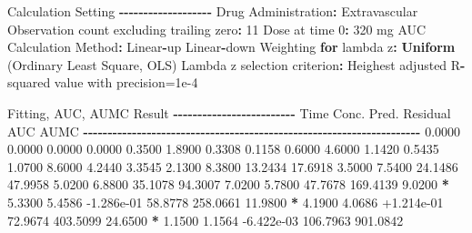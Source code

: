 \documentclass[
  10pt,
]{krantz}
\makeatletter
\newenvironment{Shaded}{\begin{snugshade}}{\end{snugshade}}
\newcommand{\ControlFlowTok}[1]{\textcolor[rgb]{0.13,0.29,0.53}{\textbf{#1}}}
\newcommand{\DecValTok}[1]{\textcolor[rgb]{0.00,0.00,0.81}{#1}}
\newcommand{\FloatTok}[1]{\textcolor[rgb]{0.00,0.00,0.81}{#1}}
\newcommand{\KeywordTok}[1]{\textcolor[rgb]{0.13,0.29,0.53}{\textbf{#1}}}
\newcommand{\NormalTok}[1]{#1}
\newcommand{\OperatorTok}[1]{\textcolor[rgb]{0.81,0.36,0.00}{\textbf{#1}}}
\newcommand{\StringTok}[1]{\textcolor[rgb]{0.31,0.60,0.02}{#1}}
\newenvironment{kframe}{%
\medskip{}
\setlength{\fboxsep}{.8em}
 \def\at@end@of@kframe{}%
 \ifinner\ifhmode%
  \def\at@end@of@kframe{\end{minipage}}%
  \begin{minipage}{\columnwidth}%
 \fi\fi%
 \def\FrameCommand##1{\hskip\@totalleftmargin \hskip-\fboxsep
 \colorbox{shadecolor}{##1}\hskip-\fboxsep
     \hskip-\linewidth \hskip-\@totalleftmargin \hskip\columnwidth}%
 \MakeFramed {\advance\hsize-\width
   \@totalleftmargin\z@ \linewidth\hsize
   \@setminipage}}%
 {\par\unskip\endMakeFramed%
 \at@end@of@kframe}
\renewenvironment{Shaded}{\begin{kframe}}{\end{kframe}}
\makeatother
\begin{document}
\begin{Shaded}
\begin{Highlighting}[]
\NormalTok{Calculation Setting}
\OperatorTok{{-}{-}{-}{-}{-}{-}{-}{-}{-}{-}{-}{-}{-}{-}{-}{-}{-}{-}{-}}
\NormalTok{Drug Administration}\OperatorTok{:}\StringTok{ }\NormalTok{Extravascular}
\NormalTok{Observation count excluding trailing zero}\OperatorTok{:}\StringTok{ }\DecValTok{11}
\NormalTok{Dose at time }\DecValTok{0}\OperatorTok{:}\StringTok{ }\DecValTok{320}\NormalTok{ mg}
\NormalTok{AUC Calculation Method}\OperatorTok{:}\StringTok{ }\NormalTok{Linear}\OperatorTok{{-}}\NormalTok{up Linear}\OperatorTok{{-}}\NormalTok{down}
\NormalTok{Weighting }\ControlFlowTok{for}\NormalTok{ lambda z}\OperatorTok{:}\StringTok{ }\KeywordTok{Uniform}\NormalTok{ (Ordinary Least Square, OLS)}
\NormalTok{Lambda z selection criterion}\OperatorTok{:}\StringTok{ }\NormalTok{Heighest adjusted R}\OperatorTok{{-}}\NormalTok{squared value with precision=}\FloatTok{1e{-}4}


\NormalTok{Fitting, AUC, AUMC Result}
\OperatorTok{{-}{-}{-}{-}{-}{-}{-}{-}{-}{-}{-}{-}{-}{-}{-}{-}{-}{-}{-}{-}{-}{-}{-}{-}{-}}
\StringTok{      }\NormalTok{Time         Conc.      Pred.   Residual       AUC       AUMC}
\OperatorTok{{-}{-}{-}{-}{-}{-}{-}{-}{-}{-}{-}{-}{-}{-}{-}{-}{-}{-}{-}{-}{-}{-}{-}{-}{-}{-}{-}{-}{-}{-}{-}{-}{-}{-}{-}{-}{-}{-}{-}{-}{-}{-}{-}{-}{-}{-}{-}{-}{-}{-}{-}{-}{-}{-}{-}{-}{-}{-}{-}{-}{-}{-}{-}{-}{-}{-}{-}{-}{-}}
\StringTok{     }\FloatTok{0.0000}       \FloatTok{0.0000}                           \FloatTok{0.0000}     \FloatTok{0.0000}
     \FloatTok{0.3500}       \FloatTok{1.8900}                           \FloatTok{0.3308}     \FloatTok{0.1158}
     \FloatTok{0.6000}       \FloatTok{4.6000}                           \FloatTok{1.1420}     \FloatTok{0.5435}
     \FloatTok{1.0700}       \FloatTok{8.6000}                           \FloatTok{4.2440}     \FloatTok{3.3545}
     \FloatTok{2.1300}       \FloatTok{8.3800}                          \FloatTok{13.2434}    \FloatTok{17.6918}
     \FloatTok{3.5000}       \FloatTok{7.5400}                          \FloatTok{24.1486}    \FloatTok{47.9958}
     \FloatTok{5.0200}       \FloatTok{6.8800}                          \FloatTok{35.1078}    \FloatTok{94.3007}
     \FloatTok{7.0200}       \FloatTok{5.7800}                          \FloatTok{47.7678}   \FloatTok{169.4139}
     \FloatTok{9.0200} \OperatorTok{*}\StringTok{     }\FloatTok{5.3300}     \FloatTok{5.4586} \FloatTok{{-}1.286e{-}01}    \FloatTok{58.8778}   \FloatTok{258.0661}
    \FloatTok{11.9800} \OperatorTok{*}\StringTok{     }\FloatTok{4.1900}     \FloatTok{4.0686} \FloatTok{+1.214e{-}01}    \FloatTok{72.9674}   \FloatTok{403.5099}
    \FloatTok{24.6500} \OperatorTok{*}\StringTok{     }\FloatTok{1.1500}     \FloatTok{1.1564} \FloatTok{{-}6.422e{-}03}   \FloatTok{106.7963}   \FloatTok{901.0842}


\end{Highlighting}
\end{Shaded}
\end{document}
